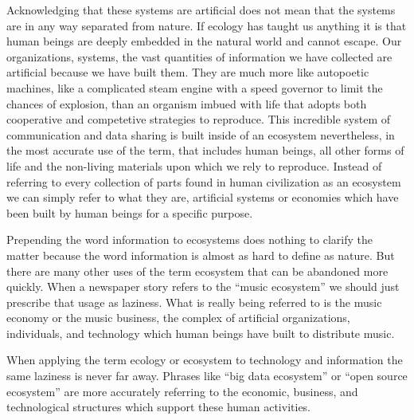 Acknowledging that these systems are artificial does not mean that the systems are in any way separated from nature. If ecology has taught us anything it is that human beings are deeply embedded in the natural world and cannot escape. Our organizations, systems, the vast quantities of information we have collected are artificial because we have built them. They are much more like autopoetic machines, like a complicated steam engine with a speed governor to limit the chances of explosion, than an organism imbued with life that adopts both cooperative and competetive strategies to reproduce. This incredible system of communication and data sharing is built inside of an ecosystem nevertheless, in the most accurate use of the term, that includes human beings, all other forms of life and the non-living materials upon which we rely to reproduce. Instead of referring to every collection of parts found in human civilization as an ecosystem we can simply refer to what they are, artificial systems or economies which have been built by human beings for a specific purpose.

Prepending the word information to ecosystems does nothing to clarify the matter because the word information is almost as hard to define as nature. But there are many other uses of the term ecosystem that can be abandoned more quickly. When a newspaper story refers to the “music ecosystem” we should just prescribe that usage as laziness. What is really being referred to is the music economy or the music business, the complex of artificial organizations, individuals, and technology which human beings have built to distribute music.

When applying the term ecology or ecosystem to technology and information the same laziness is never far away. Phrases like “big data ecosystem” or “open source ecosystem” are more accurately referring to the economic, business, and technological structures which support these human activities.